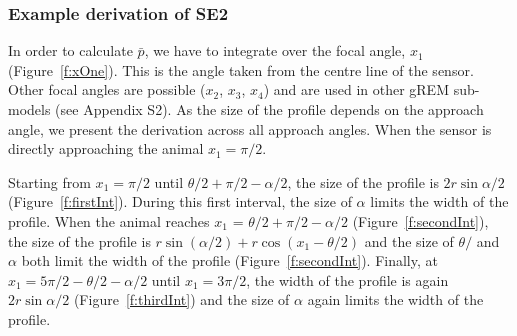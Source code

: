 \documentclass[a4paper,10pt,reqno,oneside]{amsart}
\begin{document}
\subsubsection*{Example derivation of SE2}

In order to calculate $\bar{p}$, we have to integrate over the focal angle, $x_1$ (Figure~\ref{f:xOne}). This is the angle taken from the centre line of the sensor. Other focal angles are possible ($x_2$, $x_3$, $x_4$) and are used in other gREM sub-models (see Appendix S2). As the size of the profile depends on the approach angle, we present the derivation across all approach angles. When the sensor is directly approaching the animal $x_1  = \pi/2$.

Starting from $x_1 = \pi/2$ until $\theta/2 + \pi/2 - \alpha/2$, the size of the profile is $2r\sin \alpha/2$ (Figure~\ref{f:firstInt}). During this first interval, the size of $\alpha$ limits the width of the profile. When the animal reaches $x_1$  = $\theta/2 + \pi/2 - \alpha/2$ (Figure~\ref{f:secondInt}), the size of the profile is $r\sin( \alpha/2) + r\cos( x_1  - \theta/2)$ and the size of $\theta/$ and $\alpha$ both limit the width of the profile (Figure~\ref{f:secondInt}). Finally, at $x_1  = 5\pi/2 - \theta/2  - \alpha/2$ until $x_1  = 3\pi/2$, the width of the profile is again $2r\sin\alpha/2$ (Figure~\ref{f:thirdInt}) and the size of $\alpha$ again limits the width of the profile. 
\end{document}
